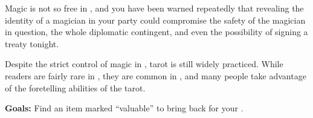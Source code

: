 \documentclass[blue]{NeptuneBall}
\begin{document}
\begin{itemize}
  Magic is not so free in \pAtlantis{}, and you have been warned repeatedly that revealing the identity of a magician in your party could compromise the safety of the magician in question, the whole diplomatic contingent, and even the possibility of signing a treaty tonight.
  
  Despite the strict control of magic in \pAtlantis{}, tarot is still widely practiced. While readers are fairly rare in \pPacifica{}, they are common in \pAtlantis{}, and many people take advantage of the foretelling abilities of the tarot.
\end{itemize}

{\bf Goals:} Find an item marked ``valuable'' to bring back for your \cPacificanRuler{\King}.
\end{document}
